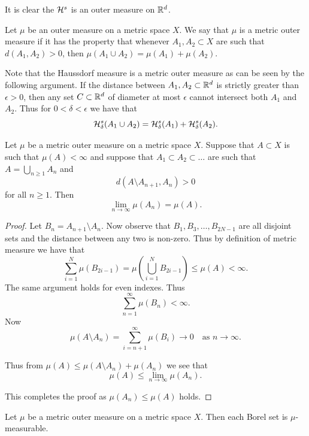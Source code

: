 \documentclass[twoside, a4paper, 10pt]{amsart}
\begin{document}
It is clear the $\mathcal{H}^s$ is an outer measure on $\mathbb{R}^d$.

\begin{mydef} Let $\mu$ be an outer measure on a metric space $X$. We say that $\mu$ is a metric outer measure if it has the property that whenever $A_1,A_2 \subset X$ are such that $d(A_1, A_2) > 0$, then $\mu(A_1 \cup A_2) = \mu(A_1) + \mu(A_2).$ 

\end{mydef}

Note that the Haussdorf measure is a metric outer measure as can be seen by the following argument. If the distance between $A_1,A_2 \subset \mathbb{R}^d$ is strictly greater than $\epsilon>0$, then any set $C \subset \mathbb{R}^d$ of diameter at most $\epsilon$ cannot intersect both $A_1$ and $A_2$. Thus for $0 < \delta <\epsilon$ we have that 
$$\mathcal{H}^s_{\delta}(A_1 \cup A_2) = \mathcal{H}^s_{\delta}(A_1) + \mathcal{H}^s_{\delta}(A_2).$$

\begin{lemma} Let $\mu$ be a metric outer measure on a metric space $X$. Suppose that $A \subset X$ is such that $\mu(A) < \infty$ and suppose that $A_1 \subset A_2 \subset \ldots$ are such that $A = \bigcup_{n \geq 1} A_n$ and $$d(A \setminus A_{n+1}, A_n) >0 $$ for all $n \geq 1$. Then $$\lim_{n \to \infty} \mu(A_n) = \mu(A).$$

\end{lemma}

\begin{proof} Let $B_n = A_{n+1}\setminus A_n$. Now observe that $B_1,B_3, \ldots, B_{2N-1}$ are all disjoint sets and the distance between any two is non-zero. Thus by definition of metric measure we have that $$\sum_{i=1}^N\mu(B_{2i-1}) = \mu(\bigcup_{i=1}^N B_{2i-1}) \leq \mu(A) < \infty.$$ The same argument holds for even indexes. Thus $$\sum_{n=1}^{\infty} \mu(B_n) < \infty.$$ 
Now $$\mu(A \setminus A_n) = \sum_{i=n+1}^{\infty} \mu(B_i) \to 0 \quad\text{as } n \to \infty.$$

Thus from $\mu(A) \leq \mu(A \setminus A_n) + \mu(A_n)$ we see that $$\mu(A) \leq \lim_{n \to \infty} \mu(A_n).$$

This completes the proof as $\mu(A_n) \leq \mu(A)$ holds. \end{proof}

\begin{thm} Let $\mu$ be a metric outer measure on a metric space $X$. Then each Borel set is $\mu$-measurable.

\end{thm}
\end{document}
